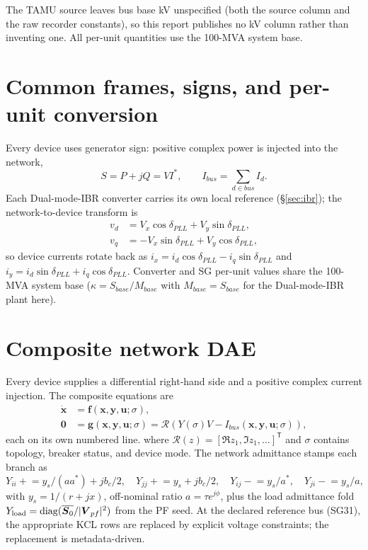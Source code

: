 \documentclass[12pt,a4paper]{article}
\newcommand{\vect}[1]{\boldsymbol{#1}}
\begin{document}
The TAMU source leaves bus base kV unspecified (both the source column and
the raw recorder constants), so this report publishes no kV column rather than
inventing one.  All per-unit quantities use the 100-MVA system base.

\section{Common frames, signs, and per-unit conversion}

Every device uses generator sign: positive complex power is injected into the
network,
\[
S=P+jQ=V I^*,\qquad I_{bus}=\sum_{d\in bus} I_d.
\]
Each Dual-mode-IBR converter carries its own local reference (\S\ref{sec:ibr}); the
network-to-device transform is
\begin{align}
v_d&=V_x\cos\delta_{PLL}+V_y\sin\delta_{PLL},\\
v_q&=-V_x\sin\delta_{PLL}+V_y\cos\delta_{PLL},
\end{align}
so device currents rotate back as
$i_x=i_d\cos\delta_{PLL}-i_q\sin\delta_{PLL}$ and
$i_y=i_d\sin\delta_{PLL}+i_q\cos\delta_{PLL}$.  Converter and SG per-unit
values share the 100-MVA system base ($\kappa=S_{base}/M_{base}$ with
$M_{base}=S_{base}$ for the Dual-mode-IBR plant here).

\section{Composite network DAE}

Every device supplies a differential right-hand side and a positive complex
current injection.  The composite equations are
\begin{align}
\dot{\vect x}&=\vect f(\vect x,\vect y,\vect u;\sigma),\\
\vect 0&=\vect g(\vect x,\vect y,\vect u;\sigma)
          =\mathcal R\!\left(Y(\sigma)V-I_{bus}(\vect x,\vect y,\vect u;\sigma)\right),
\end{align}
each on its own numbered line.
where $\mathcal R(z)=[\Re z_1,\Im z_1,\ldots]^{\mathsf T}$ and $\sigma$
contains topology, breaker status, and device mode.  The network admittance
stamps each branch as
\[
Y_{ii}\mathrel{+}=y_s/(a a^*)+jb_c/2,\quad
Y_{jj}\mathrel{+}=y_s+jb_c/2,\quad
Y_{ij}\mathrel{-}=y_s/a^*,\quad
Y_{ji}\mathrel{-}=y_s/a,
\]
with $y_s=1/(r+jx)$, off-nominal ratio $a=\tau e^{j\phi}$, plus the load
admittance fold $Y_{\rm load}=\operatorname{diag}(\overline{\vect S_0}/|\vect V_{pf}|^2)$
from the PF seed.  At the declared reference bus (SG31), the appropriate KCL
rows are replaced by explicit voltage constraints; the replacement is
metadata-driven.
\end{document}
